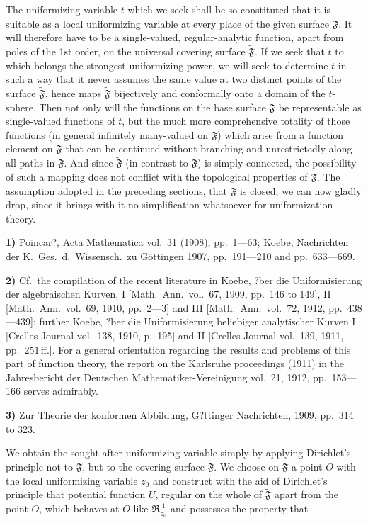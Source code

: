 \documentclass{article}
\begin{document}
The uniformizing variable $t$ which we seek shall be so constituted that it is suitable as a local uniformizing variable at every place of the given surface $\mathfrak{F}$. It will therefore have to be a single-valued, regular-analytic function, apart from poles of the 1st order, on the universal covering surface $\widetilde{\mathfrak{F}}$. If we seek that $t$ to which belongs the strongest uniformizing power, we will seek to determine $t$ in such a way that it never assumes the same value at two distinct points of the surface $\widetilde{\mathfrak{F}}$, hence maps $\widetilde{\mathfrak{F}}$ bijectively and conformally onto a domain of the $t$-sphere. Then not only will the functions on the base surface $\mathfrak{F}$ be representable as single-valued functions of $t$, but the much more comprehensive totality of those functions (in general infinitely many-valued on $\mathfrak{F}$) which arise from a function element on $\mathfrak{F}$ that can be continued without branching and unrestrictedly along all paths in $\mathfrak{F}$. And since $\widetilde{\mathfrak{F}}$ (in contrast to $\mathfrak{F}$) is simply connected, the possibility of such a mapping does not conflict with the topological properties of $\widetilde{\mathfrak{F}}$. The assumption adopted in the preceding sections, that $\mathfrak{F}$ is closed, we can now gladly drop, since it brings with it no simplification whatsoever for uniformization theory.

\textbf{1)} Poincar?, Acta Mathematica vol.~31 (1908), pp.~1---63; Koebe, Nachrichten der K.~Ges.\ d.~Wissensch.\ zu Göttingen 1907, pp.~191---210 and pp.~633---669.

\textbf{2)} Cf.\ the compilation of the recent literature in Koebe, ?ber die Uniformisierung der algebraischen Kurven, I [Math.\ Ann.\ vol.~67, 1909, pp.~146 to 149], II [Math.\ Ann.\ vol.~69, 1910, pp.~2---3] and III [Math.\ Ann.\ vol.~72, 1912, pp.~438---439]; further Koebe, ?ber die Uniformisierung beliebiger analytischer Kurven I [Crelles Journal vol.~138, 1910, p.~195] and II [Crelles Journal vol.~139, 1911, pp.~251\,ff.]. For a general orientation regarding the results and problems of this part of function theory, the report on the Karlsruhe proceedings (1911) in the Jahresbericht der Deutschen Mathematiker-Vereinigung vol.~21, 1912, pp.~153---166 serves admirably.

\textbf{3)} Zur Theorie der konformen Abbildung, G?ttinger Nachrichten, 1909, pp.~314 to 323.

We obtain the sought-after uniformizing variable simply by applying Dirichlet's principle not to $\mathfrak{F}$, but to the covering surface $\widetilde{\mathfrak{F}}$. We choose on $\widetilde{\mathfrak{F}}$ a point $O$ with the local uniformizing variable $z_0$ and construct with the aid of Dirichlet's principle that potential function $U$, regular on the whole of $\widetilde{\mathfrak{F}}$ apart from the point $O$, which behaves at $O$ like $\Re \frac{1}{z_0}$ and possesses the property that
\end{document}
